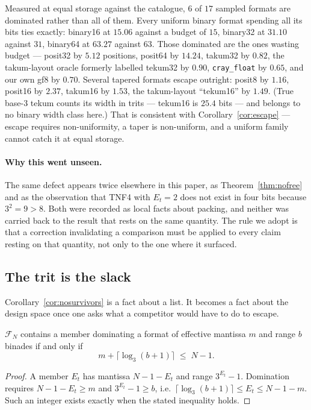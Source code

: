 Measured at equal storage against the catalogue, $6$ of $17$ sampled formats are
dominated rather than all of them. Every uniform binary format spending all its
bits ties exactly: binary16 at $15.06$ against a budget of $15$, binary32 at
$31.10$ against $31$, binary64 at $63.27$ against $63$. Those dominated are the
ones wasting budget --- posit32 by $5.12$ positions, posit64 by $14.24$, takum32
by $0.82$, the takum-layout oracle formerly labelled tekum32 by $0.90$,
\texttt{cray\_float} by $0.65$, and our own gf8 by
$0.70$. Several tapered formats escape outright: posit8 by $1.16$, posit16 by
$2.37$, takum16 by $1.53$, the takum-layout ``tekum16'' by $1.49$. (True
base-3 tekum counts its width in trits --- tekum16 is $25.4$ bits --- and
belongs to no binary width class here.) That is consistent with
Corollary~\ref{cor:escape} --- escape requires non-uniformity, a taper is
non-uniform, and a uniform family cannot catch it at equal storage.

\paragraph{Why this went unseen.} The same defect appears twice elsewhere in this
paper, as Theorem~\ref{thm:nofree} and as the observation that TNF4 with $E_t=2$
does not exist in four bits because $3^{2}=9>8$. Both were recorded as local
facts about packing, and neither was carried back to the result that rests on the
same quantity. The rule we adopt is that a correction invalidating a comparison
must be applied to every claim resting on that quantity, not only to the one
where it surfaced.


\subsection{The trit is the slack}

\label{sec:slack}

Corollary~\ref{cor:nosurvivors} is a fact about a list. It becomes a fact about
the design space once one asks what a competitor would have to do to escape.

\begin{theorem}
\label{thm:coverage}
$\mathcal{F}_N$ contains a member dominating a format of effective mantissa $m$
and range $b$ binades if and only if
\[
  m + \lceil \log_3 (b+1) \rceil \;\le\; N-1 .
\]
\end{theorem}
\begin{proof}
A member $E_t$ has mantissa $N-1-E_t$ and range $3^{E_t}-1$. Domination requires
$N-1-E_t \ge m$ and $3^{E_t}-1 \ge b$, i.e.\ $\lceil\log_3(b+1)\rceil \le E_t \le
N-1-m$. Such an integer exists exactly when the stated inequality holds.
\end{proof}

